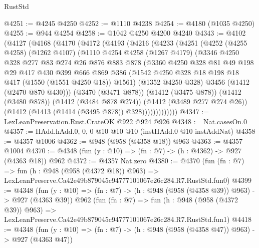 \begin{lexlean}{RustStd}
\begin{coremodule}
@4251 := @4245 @4250
@4252 := @1110 @4238
@4254 := @4180 (@1035 @4250)
@4255 := @944 @4254
@4258 := @1042 @4250 @4200 @4240
@4343 := @4102
    (@4127
      (@4168
        (@4170
          (@4172
            (@4193
              (@4216
                (@4233
                  (@4251
                    (@4252
                      (@4255 @4258)
                      (@1262 @4107)
                      (@1110
                        @4254
                        @4258
                        (@1267 @4179)
                        (@3346
                          @4250
                          @328
                          @277
                          @83
                          @274
                          @26
                          @876
                          @883
                          @878
                          (@3360
                            @4250
                            @328
                            @81
                            @49
                            @198
                            @29
                            @417
                            @430
                            @399
                            @666
                            @869
                            @386
                            (@1542 @4250 @328 @18 @198 @18 @417 (@1550 (@1551 @4250 @18)) @1561)
                            (@1352 @4250 @328)
                            @3456
                            (@1412 (@2470 @870 @430)))
                          (@3470 (@3471 @878))
                          (@1412 (@3475 @878))
                          (@1412 (@3480 @878))
                          (@1412 (@3484 @878 @274))
                          (@1412 (@3489 @277 @274 @26))
                          (@1412 (@1413 (@1414 (@3495 @878)) @328)))))))))))))
@4347 := LexLeanPreservation.Rust.CrateOK @922 @924 @926
@4348 := Nat.casesOn.{0}
@4357 := HAdd.hAdd.{0, 0, 0} @10 @10 @10 (instHAdd.{0} @10 instAddNat)
@4358 := @4357 @1006
@4362 := @948 (@958 (@4358 @18)) @963
@4363 := @4357 @1004
@4370 := @4348 (fun (y : @10) => (fn : @7) -> (h : @4362) -> @927 (@4363 @18)) @962
@4372 := @4357 Nat.zero
@4380 := @4370
    (fun (fn : @7) =>
    fun (h : @948 (@958 (@4372 @18)) @963) =>
    LexLeanPreserve.Ca42e49b879045c94777101067e26c284.R7.RustStd.fun0)
@4399 := @4348
    (fun (y : @10) => (fn : @7) -> (h : @948 (@958 (@4358 @39)) @963) -> @927 (@4363 @39))
    @962
    (fun (fn : @7) =>
    fun (h : @948 (@958 (@4372 @39)) @963) =>
    LexLeanPreserve.Ca42e49b879045c94777101067e26c284.R7.RustStd.fun1)
@4418 := @4348
    (fun (y : @10) => (fn : @7) -> (h : @948 (@958 (@4358 @47)) @963) -> @927 (@4363 @47))

\end{coremodule}
\end{lexlean}
